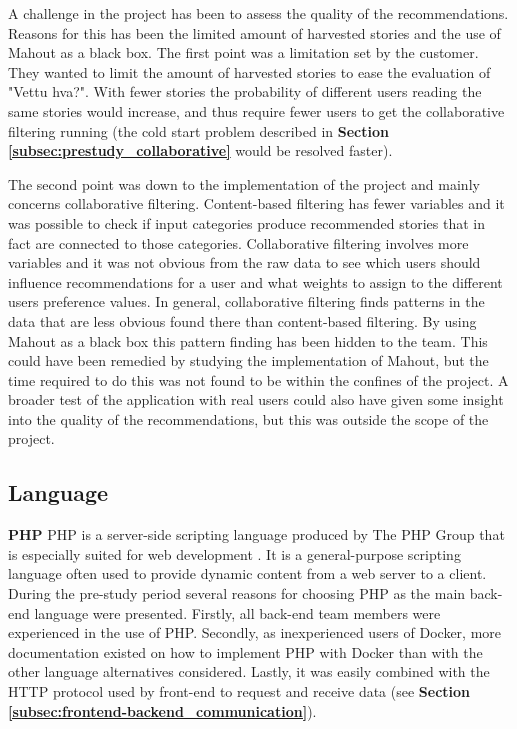 A challenge in the project has been to assess the quality of the recommendations. Reasons for this has been the limited amount of harvested stories and the use of Mahout as a black box. The first point was a limitation set by the customer. They wanted to limit the amount of harvested stories to ease the evaluation of "Vettu hva?". With fewer stories the probability of different users reading the same stories would increase, and thus require fewer users to get the collaborative filtering running (the cold start problem described in \textbf{Section \ref{subsec:prestudy_collaborative}} would be resolved faster). \newline

The second point was down to the implementation of the project and mainly concerns collaborative filtering. Content-based filtering has fewer variables and it was possible to check if input categories produce recommended stories that in fact are connected to those categories. Collaborative filtering involves more variables and it was not obvious from the raw data to see which users should influence recommendations for a user and what weights to assign to the different users preference values. In general, collaborative filtering finds patterns in the data that are less obvious found there than content-based filtering. By using Mahout as a black box this pattern finding has been hidden to the team. This could have been remedied by studying the implementation of Mahout, but the time required to do this was not found to be within the confines of the project. A broader test of the application with real users could also have given some insight into the quality of the recommendations, but this was outside the scope of the project. \newline


\subsection{Language}
\label{subsec:backend_language}
\textbf{PHP}\newline
PHP is a server-side scripting language produced by The PHP Group that is especially suited for web development  \cite{HM8}. It is a general-purpose scripting language often used to provide dynamic content from a web server to a client. During the pre-study period several reasons for choosing PHP as the main back-end language were presented. Firstly, all back-end team members were experienced in the use of PHP. Secondly, as inexperienced users of Docker, more documentation existed on how to implement PHP with Docker than with the other language alternatives considered. Lastly, it was easily combined with the HTTP protocol used by front-end to request and receive data (see \textbf{Section \ref{subsec:frontend-backend_communication}}).\newline

